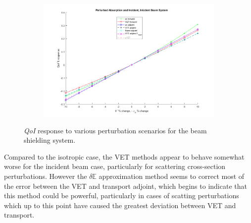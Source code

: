 \documentclass[12pt]{report}
\newcommand{\Edd}{\mathbb{E}}
\newcommand{\qoi}{{\it QoI}\xspace}
\begin{document}
\begin{figure}[H]
\begin{subfigure}{.5\textwidth}
\end{subfigure}%
\begin{subfigure}{.5\textwidth}
  \centering
  \includegraphics[width=.98\linewidth]{figures2/25incsigaSensNoavet.png}
\end{subfigure}
\caption{\qoi response to various perturbation scenarios for the beam shielding system.}
\label{fig:Trial31}
\end{figure}

Compared to the isotropic case, the VET methods appear to behave somewhat worse for the incident beam case, particularly for scattering cross-section perturbations. However the $\delta \Edd$ approximation method seems to correct most of the error between the VET and transport adjoint, which begins to indicate that this method could be powerful, particularly in cases of scatting perturbations which up to this point have caused the greatest deviation between VET and transport. 
\end{document}
